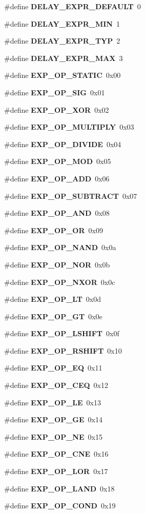 \begin{CompactItemize}
\item 
\#define {\bf DELAY\_\-EXPR\_\-DEFAULT}\ 0
\item 
\#define {\bf DELAY\_\-EXPR\_\-MIN}\ 1
\item 
\#define {\bf DELAY\_\-EXPR\_\-TYP}\ 2
\item 
\#define {\bf DELAY\_\-EXPR\_\-MAX}\ 3
\item 
\#define {\bf EXP\_\-OP\_\-STATIC}\ 0x00
\item 
\#define {\bf EXP\_\-OP\_\-SIG}\ 0x01
\item 
\#define {\bf EXP\_\-OP\_\-XOR}\ 0x02
\item 
\#define {\bf EXP\_\-OP\_\-MULTIPLY}\ 0x03
\item 
\#define {\bf EXP\_\-OP\_\-DIVIDE}\ 0x04
\item 
\#define {\bf EXP\_\-OP\_\-MOD}\ 0x05
\item 
\#define {\bf EXP\_\-OP\_\-ADD}\ 0x06
\item 
\#define {\bf EXP\_\-OP\_\-SUBTRACT}\ 0x07
\item 
\#define {\bf EXP\_\-OP\_\-AND}\ 0x08
\item 
\#define {\bf EXP\_\-OP\_\-OR}\ 0x09
\item 
\#define {\bf EXP\_\-OP\_\-NAND}\ 0x0a
\item 
\#define {\bf EXP\_\-OP\_\-NOR}\ 0x0b
\item 
\#define {\bf EXP\_\-OP\_\-NXOR}\ 0x0c
\item 
\#define {\bf EXP\_\-OP\_\-LT}\ 0x0d
\item 
\#define {\bf EXP\_\-OP\_\-GT}\ 0x0e
\item 
\#define {\bf EXP\_\-OP\_\-LSHIFT}\ 0x0f
\item 
\#define {\bf EXP\_\-OP\_\-RSHIFT}\ 0x10
\item 
\#define {\bf EXP\_\-OP\_\-EQ}\ 0x11
\item 
\#define {\bf EXP\_\-OP\_\-CEQ}\ 0x12
\item 
\#define {\bf EXP\_\-OP\_\-LE}\ 0x13
\item 
\#define {\bf EXP\_\-OP\_\-GE}\ 0x14
\item 
\#define {\bf EXP\_\-OP\_\-NE}\ 0x15
\item 
\#define {\bf EXP\_\-OP\_\-CNE}\ 0x16
\item 
\#define {\bf EXP\_\-OP\_\-LOR}\ 0x17
\item 
\#define {\bf EXP\_\-OP\_\-LAND}\ 0x18
\item 
\#define {\bf EXP\_\-OP\_\-COND}\ 0x19
\item 

\end{CompactItemize}
